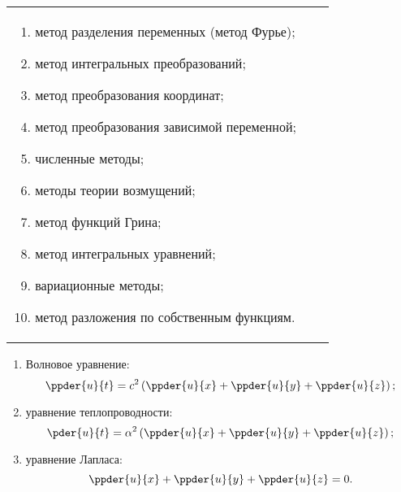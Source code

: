 \begin{table}[h!]
\begin{tabular}{m{}cm{}}
        \begin{enumerate}
            \item метод разделения переменных (метод Фурье);
            \item метод интегральных преобразований;
            \item метод преобразования координат;
            \item метод преобразования зависимой переменной;
            \item численные методы;
            \item методы теории возмущений;
            \item метод функций Грина;
            \item метод интегральных уравнений;
            \item вариационные методы;
            \item метод разложения по собственным функциям.
        \end{enumerate}
    \end{tabular}
\end{table}


\begin{enumerate}
    \item Волновое уравнение:
    \[
        \ppder{u}{t} = c^2\left(\ppder{u}{x} + \ppder{u}{y} +
        \ppder{u}{z}\right);
    \]

    \item уравнение теплопроводности:
    \[
        \pder{u}{t} = \alpha^2\left(\ppder{u}{x} + \ppder{u}{y} +
        \ppder{u}{z}\right);
    \]

    \item уравнение Лапласа:
    \[
        \ppder{u}{x} + \ppder{u}{y} + \ppder{u}{z} = 0.
    \]
\end{enumerate}

\newpage %
